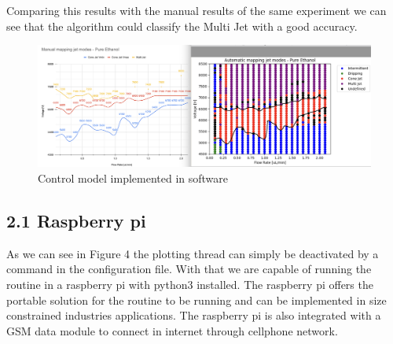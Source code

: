     Comparing this results with the manual results of the same experiment we can see that the algorithm could classify the Multi Jet with a good accuracy.

    \begin{figure}[H]
        \center
        \includegraphics[width=18cm]{images/image_folder_report_4/map7-comparison.png}
        \caption{Control model implemented in software}
    \end{figure}



\subsection*{2.1 Raspberry pi}

As we can see in Figure 4 the plotting thread can simply be deactivated by a command in the configuration file.
With that we are capable of running the routine in a raspberry pi with python3 installed.
The raspberry pi offers the portable solution for the routine to be running and can be implemented in size constrained industries applications.
The raspberry pi is also integrated with a GSM data module to connect in internet through cellphone network.
